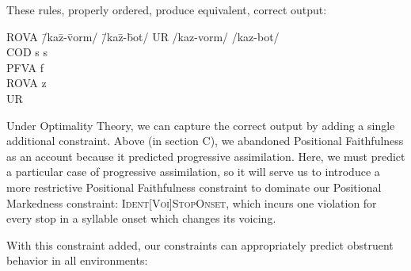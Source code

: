 \documentclass[doc,12pt]{apa6}
\begin{document}
\noindent

These rules, properly ordered, produce equivalent, correct output:

\begin{exe}
	\ex \begin{tabbing}
		ROVA \= /ka\=z-\=vorm/ \= /ka\=z-\=bot/ \kill
		UR   \> /kaz-vorm/ \> \> \> /kaz-bot/ \\
		COD  \>  \>s \> \> \>s \\
		PFVA  \> \> \>f \\
		ROVA \> \> \> \> \>z \\
		UR \>[kasform] \> \> \>[kazbot]
		\end{tabbing}
\end{exe}

Under Optimality Theory, we can capture the correct output by adding a single
additional constraint. Above (in section C), we abandoned Positional
Faithfulness as an account because it predicted progressive assimilation.
Here, we must predict a particular case of progressive assimilation, so it will
serve us to introduce a more restrictive Positional Faithfulness constraint to
dominate our Positional Markedness constraint: \textsc{Ident[Voi]StopOnset},
which incurs one violation for every stop in a syllable onset which changes its
voicing.

With this constraint added, our constraints can appropriately predict obstruent
behavior in all environments:

\begin{center}


\end{center}
\end{document}
